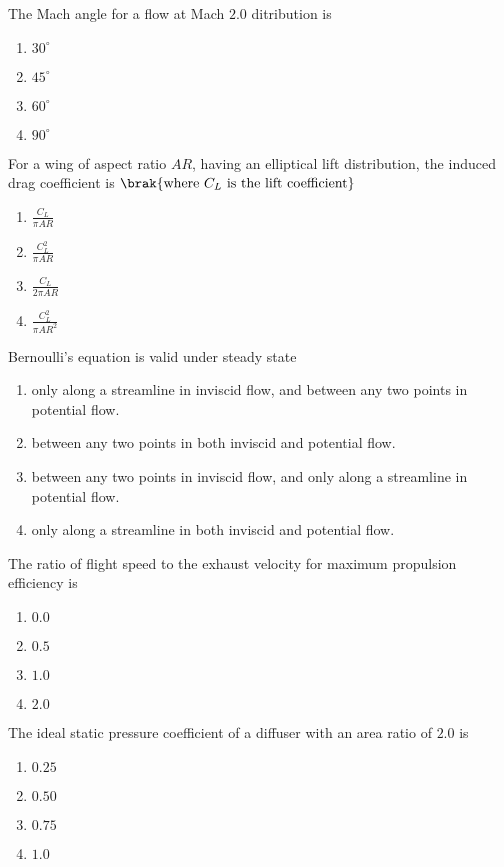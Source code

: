 \item The Mach angle for a flow at Mach $2.0$ ditribution is
\hfill{}
\begin{enumerate}
\item $30^\circ$
\item $45^\circ$
\item $60^\circ$
\item $90^\circ$
\end{enumerate}

\item For a wing of aspect ratio $AR$, having an elliptical lift distribution, the induced drag coefficient is $\brak{\text{where }C_L\text{ is the lift coefficient}}$
\hfill{}
\begin{enumerate}
\item $\frac{C_L}{\pi AR}$
\item $\frac{C_L^{2}}{\pi AR}$
\item $\frac{C_L}{2\pi AR}$
\item $\frac{C_L^{2}}{\pi A R^{2}}$
\end{enumerate}

\item Bernoulli's equation is valid under steady state
\hfill{}
\begin{enumerate}
\item only along a streamline in inviscid flow, and between any two points in potential flow.
\item between any two points in both inviscid and potential flow.
\item between any two points in inviscid flow, and only along a streamline in potential flow.
\item only along a streamline in both inviscid and potential flow.
\end{enumerate}

\item The ratio of flight speed to the exhaust velocity for maximum propulsion efficiency is
\hfill{}
\begin{enumerate}
\item $0.0$
\item $0.5$
\item $1.0$
\item $2.0$
\end{enumerate}

\item The ideal static pressure coefficient of a diffuser with an area ratio of $2.0$ is
\hfill{}
\begin{enumerate}
\item $0.25$
\item $0.50$
\item $0.75$
\item $1.0$
\end{enumerate}

